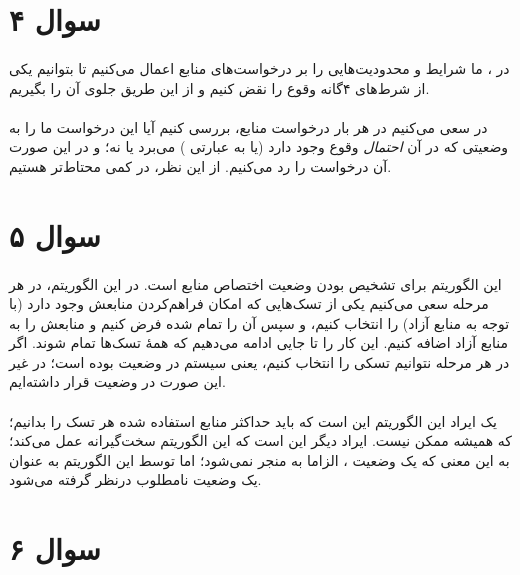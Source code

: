 \documentclass{article}
\begin{document}
	\section*{سوال ۴}
	\paragraph*{}
	در
	،
	ما شرایط و محدودیت‌هایی را بر درخواست‌های منابع اعمال می‌کنیم تا بتوانیم یکی از شرط‌های ۴گانه وقوع
	را نقض کنیم و از این طریق جلوی آن را بگیریم.

	\paragraph*{}
	در
	سعی می‌کنیم در هر بار درخواست منابع، بررسی کنیم آیا این درخواست ما را به وضعیتی که در آن
	\textit{احتمال}
	وقوع
	وجود دارد (یا به عبارتی ) می‌برد یا نه؛ و در این صورت آن درخواست را رد می‌کنیم. از این نظر، در
	کمی محتاط‌تر هستیم.

	\section*{سوال ۵}
	\paragraph*{}
	این الگوریتم برای تشخیص
	بودن وضعیت اختصاص منابع است.
	در این الگوریتم، در هر مرحله سعی می‌کنیم یکی از تسک‌هایی که امکان فراهم‌کردن منابعش وجود دارد (با توجه به منابع آزاد) را انتخاب کنیم، و سپس آن را تمام شده فرض کنیم و منابعش را به منابع آزاد اضافه کنیم. این کار را تا جایی ادامه می‌دهیم که همهٔ تسک‌ها تمام شوند. اگر در هر مرحله نتوانیم تسکی را انتخاب کنیم، یعنی سیستم در وضعیت
	بوده است؛ در غیر این صورت در وضعیت
	قرار داشته‌ایم.

	\paragraph*{}
	یک ایراد این الگوریتم این است که باید حداکثر منابع استفاده شده هر تسک را بدانیم؛ که همیشه ممکن نیست. ایراد دیگر این است که این الگوریتم سخت‌گیرانه عمل می‌کند؛ به این معنی که یک وضعیت
	،
	الزاما به
	منجر نمی‌شود؛ اما توسط این الگوریتم به عنوان یک وضعیت نامطلوب درنظر گرفته می‌شود.

	\section*{سوال ۶}
\end{document}
